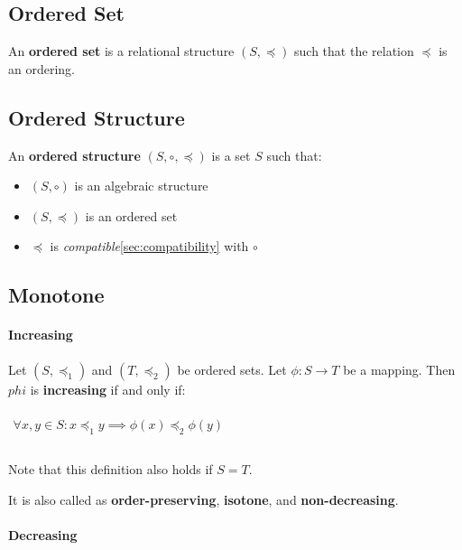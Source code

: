 \subsection{Ordered Set}
\label{sec:ordered-set}

An \textbf{ordered set} is a relational structure $(S, \preceq)$ such
that the relation $\preceq$ is an ordering.


\subsection{Ordered Structure}
\label{sec:ordered-structure}

An \textbf{ordered structure} $(S, \circ, \preceq)$ is a set $S$ such
that:

\begin{itemize}
\item $(S, \circ)$ is an algebraic structure
\item $(S, \preceq)$ is an ordered set
\item $\preceq$ is \textit{compatible}\ref{sec:compatibility} with
  $\circ$
\end{itemize}


\subsection{Monotone}

\paragraph{Increasing}
\label{sec:increasing}

Let $(S, \preceq_1)$ and $(T, \preceq_2)$ be ordered sets. Let
$\phi: S \to T$ be a mapping. Then $phi$ is \textbf{increasing} if and
only if:

\begin{math}
  \begin{array}{c}
    \\
    \forall x, y \in S: x \preceq_1 y \implies \phi(x) \preceq_2 \phi(y) \\
    \\
  \end{array}
\end{math}

Note that this definition also holds if $S = T$.

It is also called as \textbf{order-preserving}, \textbf{isotone}, and
\textbf{non-decreasing}.

\paragraph{Decreasing}
\label{sec:decreasing}

